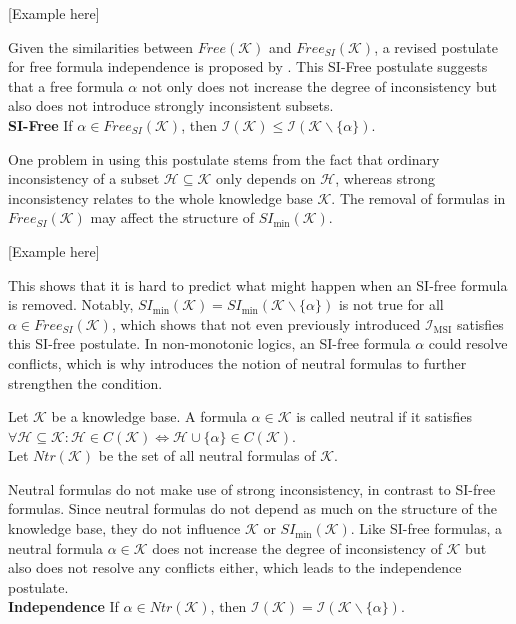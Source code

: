 [Example here]

Given the similarities between \(Free(\mathcal{K})\) and \(Free_{SI}(\mathcal{K})\), a revised postulate for free formula independence is proposed by \cite{ulbricht_handling_2020}. This SI-Free postulate suggests that a free formula \(\alpha\) not only does not increase the degree of inconsistency but also does not introduce strongly inconsistent subsets.
\\
\textbf{SI-Free}
If \(\alpha \in Free_{SI}(\mathcal{K})\), then \(\mathcal{I}(\mathcal{K}) \leq \mathcal{I}(\mathcal{K} \backslash \{\alpha\})\).

One problem in using this postulate stems from the fact that ordinary inconsistency of a subset \(\mathcal{H} \subseteq \mathcal{K}\) only depends on \(\mathcal{H}\), whereas strong inconsistency relates to the whole knowledge base \(\mathcal{K}\). The removal of formulas in \(Free_{SI}(\mathcal{K})\) may affect the structure of \(SI_{\min}(\mathcal{K})\).

    [Example here]

This shows that it is hard to predict what might happen when an SI-free formula is removed. Notably, \(SI_{\min}(\mathcal{K}) = SI_{\min}(\mathcal{K} \backslash \{\alpha\})\) is not true for all \(\alpha \in Free_{SI}(\mathcal{K})\), which shows that not even previously introduced \(\mathcal{I}_{\text{MSI}}\) satisfies this SI-free postulate. In non-monotonic logics, an SI-free formula \(\alpha\) could resolve conflicts, which is why \cite{brewka_strong_2017} introduces the notion of neutral formulas to further strengthen the condition.

\begin{definition}
    Let \(\mathcal{K}\) be a knowledge base. A formula \(\alpha \in \mathcal{K}\) is called neutral if it satisfies\\
    \(\forall \mathcal{H} \subseteq \mathcal{K}: \mathcal{H} \in C(\mathcal{K}) \Leftrightarrow \mathcal{H} \cup \{\alpha\} \in C(\mathcal{K})\).\\
    Let \(Ntr(\mathcal{K})\) be the set of all neutral formulas of \(\mathcal{K}\).
\end{definition}

Neutral formulas do not make use of strong inconsistency, in contrast to SI-free formulas. Since neutral formulas do not depend as much on the structure of the knowledge base, they do not influence \(\mathcal{K}\) or \(SI_{\min}(\mathcal{K})\). Like SI-free formulas, a neutral formula \(\alpha \in \mathcal{K}\) does not increase the degree of inconsistency of \(\mathcal{K}\) but also does not resolve any conflicts either, which leads to the independence postulate.
\\
\textbf{Independence}
If \(\alpha \in Ntr(\mathcal{K})\), then \(\mathcal{I}(\mathcal{K}) = \mathcal{I}(\mathcal{K} \backslash \{\alpha\})\).

